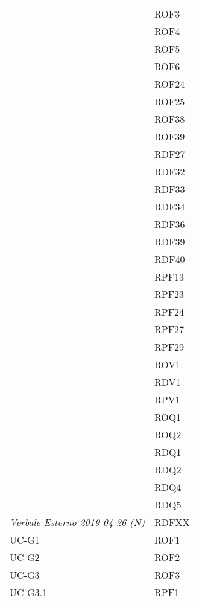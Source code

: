 \begin{longtable}{| p{5cm} | p{5cm} |}
		\rowcolor{LightGray}
		\multirow[t]{23}{*}{\cellcolor{LightGray}}{Capitolato} 
				 & ROF3 \\
				\rowcolor{LightGray} &	ROF4 \\
				\rowcolor{LightGray} &	ROF5 \\
				\rowcolor{LightGray} &	ROF6 \\
				\rowcolor{LightGray} &	ROF24 \\
				\rowcolor{LightGray} &	ROF25 \\
				\rowcolor{LightGray} &	ROF38 \\
				\rowcolor{LightGray} &	ROF39 \\
				\rowcolor{LightGray} &	RDF27 \\
				\rowcolor{LightGray} &	RDF32 \\
				\rowcolor{LightGray} &	RDF33 \\
				\rowcolor{LightGray} &	RDF34 \\
				\rowcolor{LightGray} &	RDF36 \\
				\rowcolor{LightGray} &	RDF39 \\
				\rowcolor{LightGray} &	RDF40 \\
				\rowcolor{LightGray} &	RPF13 \\
				\rowcolor{LightGray} &	RPF23 \\
				\rowcolor{LightGray} &	RPF24 \\
				\rowcolor{LightGray} &	RPF27 \\
				\rowcolor{LightGray} &	RPF29 \\
				\rowcolor{LightGray} &	ROV1 \\
				\rowcolor{LightGray} &	RDV1 \\
				\rowcolor{LightGray} &	RPV1 \\
				\rowcolor{LightGray} &	ROQ1 \\
				\rowcolor{LightGray} &	ROQ2 \\
				\rowcolor{LightGray} &	RDQ1 \\
				\rowcolor{LightGray} &	RDQ2 \\
				\rowcolor{LightGray} &	RDQ4 \\
				\rowcolor{LightGray} &	RDQ5 \\
		\textit{Verbale Esterno 2019-04-26 (N)} & RDFXX\\%
		UC-G1 & ROF1\\
		\rowcolor{LightGray}
		UC-G2 & ROF2\\
		UC-G3 & ROF3 \\
		\rowcolor{LightGray}
		UC-G3.1 & RPF1 \\

\end{longtable}
